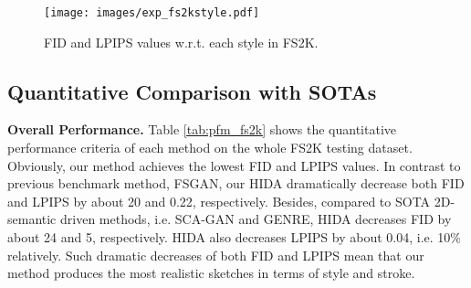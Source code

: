 \documentclass[10pt,twocolumn,letterpaper]{article}
\begin{document}
\begin{table}
	\centering
	\caption{Comparison with SOTAs on the FS2K dataset.}
	\label{tab:pfm_fs2k}
	\renewcommand\arraystretch{1.2}
\end{table}

\begin{figure}
	\centering
	\texttt{[image: images/exp\_fs2kstyle.pdf]}
	\caption{FID and LPIPS values w.r.t. each style in FS2K.}
	\label{fig:fs2kstyle}
\end{figure}


\subsection{Quantitative Comparison with SOTAs}
\label{ssec:exp_quanta}

\textbf{Overall Performance.}
Table \ref{tab:pfm_fs2k} shows the quantitative performance criteria of each method on the whole FS2K testing dataset. 
Obviously, our method achieves the lowest FID and LPIPS values. 
In contrast to previous benchmark method, FSGAN, our HIDA dramatically decrease both FID and LPIPS by about 20 and 0.22, respectively. 
Besides, compared to SOTA 2D-semantic driven methods, i.e. SCA-GAN and GENRE, HIDA decreases FID by about 24 and 5, respectively. HIDA also decreases LPIPS by about 0.04, i.e. 10\% relatively. 
Such dramatic decreases of both FID and LPIPS mean that our method produces the most realistic sketches in terms of style and stroke.
\end{document}

